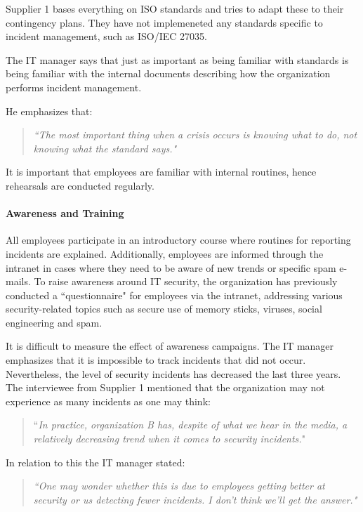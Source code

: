 Supplier 1 bases everything on \acs{ISO} standards and tries to adapt these to their contingency plans. They have not implemeneted any standards specific to incident management, such as \acs{ISO}/\acs{IEC} 27035. 

The IT manager says that just as important as being familiar with standards is being familiar with the internal documents describing how the organization performs incident management. 

He emphasizes that:
\begin{quote}
\textit{``The most important thing when a crisis occurs is knowing what to do, not knowing what the standard says."}
\end{quote}
It is important that employees are familiar with internal routines, hence rehearsals are conducted regularly.

\paragraph{Awareness and Training}
All employees participate in an introductory course where routines for reporting incidents are explained. Additionally, employees are informed through the intranet in cases where they need to be aware of new trends or specific spam e-mails. To raise awareness around IT security, the organization has previously conducted a ``questionnaire" for employees via the intranet, addressing various security-related topics such as secure use of memory sticks, viruses, social engineering and spam. 

It is difficult to measure the effect of awareness campaigns. The IT manager emphasizes that it is impossible to track incidents that did not occur. Nevertheless, the level of security incidents has decreased the last three years. The interviewee from Supplier 1 mentioned that the organization may not experience as many incidents as one may think: 

\begin{quote}
``\textit{In practice, organization B has, despite of what we hear in the media, a relatively decreasing trend when it comes to security incidents.}"
\end{quote} 

In relation to this the IT manager stated:

\begin{quote}
\textit{``One may wonder whether this is due to employees getting better at security or us detecting fewer incidents. I don't think we'll get the answer."}
\end{quote}
 
